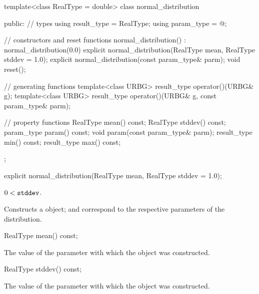 %
\begin{codeblock}
template<class RealType = double>
  class normal_distribution {
  public:
    // types
    using result_type = RealType;
    using param_type  = @\unspec@;

    // constructors and reset functions
    normal_distribution() : normal_distribution(0.0) {}
    explicit normal_distribution(RealType mean, RealType stddev = 1.0);
    explicit normal_distribution(const param_type& parm);
    void reset();

    // generating functions
    template<class URBG>
      result_type operator()(URBG& g);
    template<class URBG>
      result_type operator()(URBG& g, const param_type& parm);

    // property functions
    RealType mean() const;
    RealType stddev() const;
    param_type param() const;
    void param(const param_type& parm);
    result_type min() const;
    result_type max() const;
  };
\end{codeblock}


%
\begin{itemdecl}
explicit normal_distribution(RealType mean, RealType stddev = 1.0);
\end{itemdecl}

\begin{itemdescr}
\pnum
\requires $0 < \texttt{stddev}$.

\pnum
\effects Constructs a  object;
 and 
correspond to the respective parameters of the distribution.
\end{itemdescr}

%
\begin{itemdecl}
RealType mean() const;
\end{itemdecl}

\begin{itemdescr}
\pnum\returns The value of the  parameter
 with which the object was constructed.
\end{itemdescr}

%
\begin{itemdecl}
RealType stddev() const;
\end{itemdecl}

\begin{itemdescr}
\pnum\returns The value of the  parameter
 with which the object was constructed.
\end{itemdescr}

